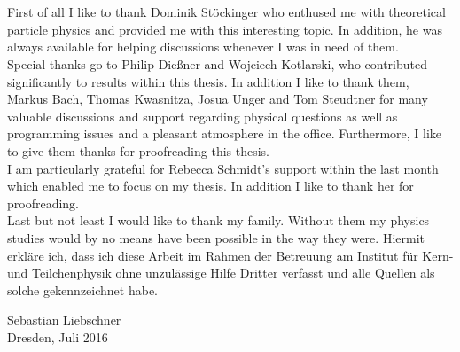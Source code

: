 \thispagestyle{empty}
\cleardoublepage
 
\tableofcontents
\newpage


\newpage

\newpage

\newpage

\newpage

\newpage

\newpage

\newpage

\newpage

\newpage
\cleardoublepage


\newpage

\newpage
\section*{}
First of all I like to thank Dominik Stöckinger who enthused me with theoretical particle physics and provided me with this interesting topic. In addition, he was always available for helping discussions whenever I was in need of them.\\
Special thanks go to Philip Dießner and Wojciech Kotlarski, who contributed significantly to results within this thesis. In addition I like to thank them, Markus Bach, Thomas Kwasnitza, Josua Unger and Tom Steudtner for many valuable discussions and support regarding physical questions as well as programming issues and a pleasant atmosphere in the office. Furthermore, I like to give them thanks for proofreading this thesis.\\
I am particularly grateful for Rebecca Schmidt's support within the last month which enabled me to focus on my thesis. In addition I like to thank her for proofreading.\\
Last but not least I would like to thank my family. Without them my physics studies would by no means have been possible in the way they were.
\newpage
\clearpage
\thispagestyle{empty}
\vspace*{1.5em}
Hiermit erkläre ich, dass ich diese Arbeit im Rahmen der Betreuung am Institut
für Kern- und Teilchenphysik ohne unzulässige Hilfe Dritter verfasst und alle Quellen als solche gekennzeichnet habe.
\vspace*{45em}
\par
Sebastian Liebschner\\
Dresden, Juli 2016


